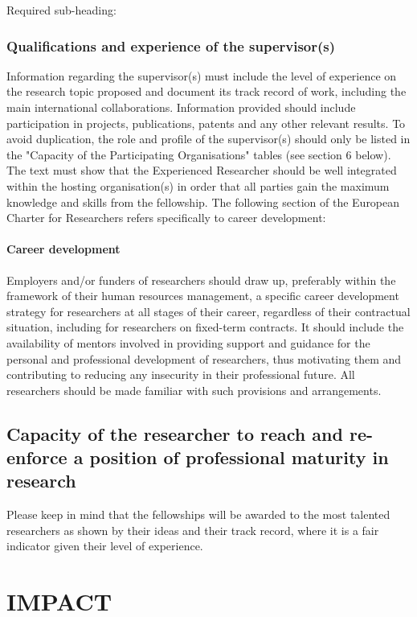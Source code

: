 \documentclass[a4paper,11pt]{article}
\begin{document}
Required sub-heading:
\subsubsection*{Qualifications and experience of the supervisor(s)}

Information regarding the supervisor(s) must include the level of experience on the research topic proposed and document its track record of work, including the main international collaborations. Information provided should include participation in projects, publications, patents and any other relevant results.
To avoid duplication, the role and profile of the supervisor(s) should only be listed in the "Capacity of the Participating Organisations" tables (see section 6 below). 
The text must show that the Experienced Researcher should be well integrated within the hosting organisation(s) in order that all parties gain the maximum knowledge and skills from the fellowship. 
The following section of the European Charter for Researchers refers specifically to career development:

\paragraph{Career development}
Employers and/or funders of researchers should draw up, preferably within the framework of their human resources management, a specific career development strategy for researchers at all stages of their career, regardless of their contractual situation, including for researchers on fixed-term contracts. It should include the availability of mentors involved in providing support and guidance for the personal and professional development of researchers, thus motivating them and contributing to reducing any insecurity in their professional future. All researchers should be made familiar with such provisions and arrangements.

\subsection{Capacity of the researcher to reach and re-enforce a position of professional maturity in research}
\label{sec:maturity}

Please keep in mind that the fellowships will be awarded to the most talented researchers as shown by their ideas and their track record, where it is a fair indicator given their level of experience. 

\section{IMPACT}
\label{sec:impact}
\end{document}
